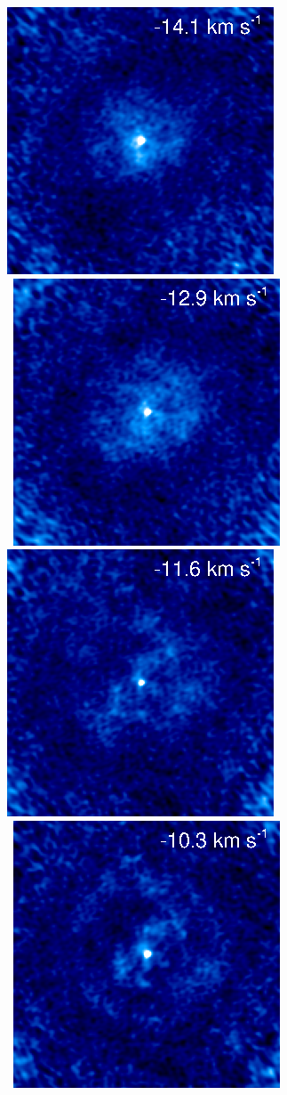 \documentclass[preprint2]{aastex}
\begin{document}
\begin{figure}[hbt!]
{          \includegraphics[]{chan38.ps}
          }
\\
\mbox{
          \includegraphics[]{chan37.ps}
          \includegraphics[]{chan36.ps}
         }
\\
\mbox{
          \includegraphics[]{chan35.ps}
}
\end{figure}
\end{document}

